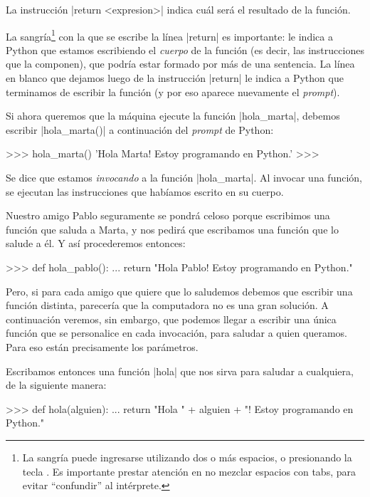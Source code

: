  La instrucción |return <expresion>| indica cuál será el resultado
de la función.

La sangría\footnote{La sangría puede ingresarse utilizando dos o más espacios,
o presionando la tecla . Es importante prestar atención en no mezclar
espacios con tabs, para evitar \enquote{confundir} al intérprete.} con la que se
escribe la línea |return| es importante: le indica a Python que estamos
escribiendo el \emph{cuerpo} de la función (es decir, las instrucciones que la
componen), que podría estar formado por más de una sentencia.  La línea en
blanco que dejamos luego de la instrucción |return| le indica a Python que
terminamos de escribir la función (y por eso aparece nuevamente el
\emph{prompt}).

Si ahora queremos que la máquina ejecute la función |hola_marta|, debemos
escribir |hola_marta()| a continuación del \emph{prompt} de Python:

\begin{codigo-python-sn}
>>> hola_marta()
'Hola Marta! Estoy programando en Python.'
>>>
\end{codigo-python-sn}

Se dice que estamos \emph{invocando} a la función |hola_marta|.  Al invocar una
función, se ejecutan las instrucciones que habíamos escrito en su cuerpo.

Nuestro amigo Pablo seguramente se pondrá celoso porque escribimos
una función que saluda a Marta, y nos pedirá que escribamos una
función que lo salude a él. Y así procederemos entonces:

\begin{codigo-python-sn}
>>> def hola_pablo():
...     return "Hola Pablo! Estoy programando en Python."
\end{codigo-python-sn}

Pero, si para cada amigo que quiere que lo saludemos debemos que
escribir una función distinta, parecería que la computadora no es
una gran solución. A continuación veremos, sin embargo, que
podemos llegar a escribir una única función que se personalice en
cada invocación, para saludar a quien queramos. Para eso están
precisamente los parámetros.

Escribamos entonces una función |hola| que nos sirva para saludar a
cualquiera, de la siguiente manera:

\begin{codigo-python-sn}
>>> def hola(alguien):
...     return "Hola " + alguien + "! Estoy programando en Python."
\end{codigo-python-sn}

